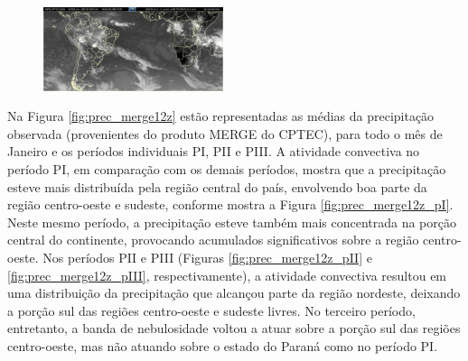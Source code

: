 \begin{figure}[H]
\begin{center}
{          \label{fig:zcas2_goes12_20130130}
          \includegraphics[width=0.47\textwidth,angle=0]{./figs/cap5/estudo_zcas/imagens_goes12/ams_afc_baixa_jpg_2013-01-30.pdf}
        }
    \end{center}
    \vspace{2mm}
    \legenda{}
    \label{fig:zcas2_goes12}
\end{figure}

Na Figura \ref{fig:prec_merge12z} estão representadas as médias da precipitação observada (provenientes do produto MERGE do CPTEC), para todo o mês de Janeiro e os períodos individuais PI, PII e PIII. A atividade convectiva no período PI, em comparação com os demais períodos, mostra que a precipitação esteve mais distribuída pela região central do país, envolvendo boa parte da região centro-oeste e sudeste, conforme mostra a Figura \ref{fig:prec_merge12z_pI}. Neste mesmo período, a precipitação esteve também mais concentrada na porção central do continente, provocando acumulados significativos sobre a região centro-oeste. Nos períodos PII e PIII (Figuras \ref{fig:prec_merge12z_pII} e \ref{fig:prec_merge12z_pIII}, respectivamente), a atividade convectiva resultou em uma distribuição da precipitação que alcançou parte da região nordeste, deixando a porção sul das regiões centro-oeste e sudeste livres. No terceiro período, entretanto, a banda de nebulosidade voltou a atuar sobre a porção sul das regiões centro-oeste, mas não atuando sobre o estado do Paraná como no período PI.

